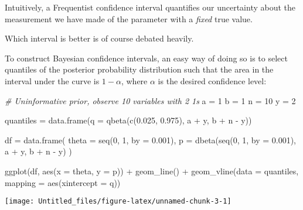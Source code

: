 \documentclass[
]{article}
\newenvironment{Shaded}{\begin{snugshade}}{\end{snugshade}}
\newcommand{\AttributeTok}[1]{\textcolor[rgb]{0.77,0.63,0.00}{#1}}
\newcommand{\CommentTok}[1]{\textcolor[rgb]{0.56,0.35,0.01}{\textit{#1}}}
\newcommand{\DecValTok}[1]{\textcolor[rgb]{0.00,0.00,0.81}{#1}}
\newcommand{\FloatTok}[1]{\textcolor[rgb]{0.00,0.00,0.81}{#1}}
\newcommand{\FunctionTok}[1]{\textcolor[rgb]{0.00,0.00,0.00}{#1}}
\newcommand{\NormalTok}[1]{#1}
\newcommand{\OtherTok}[1]{\textcolor[rgb]{0.56,0.35,0.01}{#1}}
\newcommand{\SpecialCharTok}[1]{\textcolor[rgb]{0.00,0.00,0.00}{#1}}
\begin{document}
Intuitively, a Frequentist confidence interval quantifies our
uncertainty about the measurement we have made of the parameter with a
\emph{fixed} true value.

Which interval is better is of course debated heavily.

To construct Bayesian confidence intervals, an easy way of doing so is
to select quantiles of the posterior probability distribution such that
the area in the interval under the curve is \(1 - \alpha\), where
\(\alpha\) is the desired confidence level:

\begin{Shaded}
\begin{Highlighting}[]
\CommentTok{\# Uninformative prior, observe 10 variables with 2 1s}
\NormalTok{a }\OtherTok{=} \DecValTok{1}
\NormalTok{b }\OtherTok{=} \DecValTok{1}
\NormalTok{n }\OtherTok{=} \DecValTok{10}
\NormalTok{y }\OtherTok{=} \DecValTok{2}

\NormalTok{quantiles }\OtherTok{=} \FunctionTok{data.frame}\NormalTok{(}\AttributeTok{q =} \FunctionTok{qbeta}\NormalTok{(}\FunctionTok{c}\NormalTok{(}\FloatTok{0.025}\NormalTok{, }\FloatTok{0.975}\NormalTok{), a }\SpecialCharTok{+}\NormalTok{ y, b }\SpecialCharTok{+}\NormalTok{ n }\SpecialCharTok{{-}}\NormalTok{ y))}

\NormalTok{df }\OtherTok{=} \FunctionTok{data.frame}\NormalTok{(}
  \AttributeTok{theta =} \FunctionTok{seq}\NormalTok{(}\DecValTok{0}\NormalTok{, }\DecValTok{1}\NormalTok{, }\AttributeTok{by =} \FloatTok{0.001}\NormalTok{),}
  \AttributeTok{p =} \FunctionTok{dbeta}\NormalTok{(}\FunctionTok{seq}\NormalTok{(}\DecValTok{0}\NormalTok{, }\DecValTok{1}\NormalTok{, }\AttributeTok{by =} \FloatTok{0.001}\NormalTok{), a }\SpecialCharTok{+}\NormalTok{ y, b }\SpecialCharTok{+}\NormalTok{ n }\SpecialCharTok{{-}}\NormalTok{ y)}
\NormalTok{)}

\FunctionTok{ggplot}\NormalTok{(df, }\FunctionTok{aes}\NormalTok{(}\AttributeTok{x =}\NormalTok{ theta, }\AttributeTok{y =}\NormalTok{ p)) }\SpecialCharTok{+}
  \FunctionTok{geom\_line}\NormalTok{() }\SpecialCharTok{+}
  \FunctionTok{geom\_vline}\NormalTok{(}\AttributeTok{data =}\NormalTok{ quantiles, }\AttributeTok{mapping =} \FunctionTok{aes}\NormalTok{(}\AttributeTok{xintercept =}\NormalTok{ q))}
\end{Highlighting}
\end{Shaded}

\begin{center}\texttt{[image: Untitled\_files/figure-latex/unnamed-chunk-3-1]} \end{center}
\end{document}
